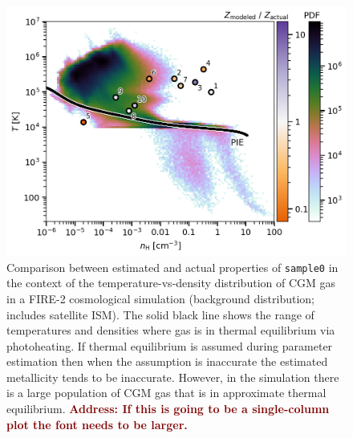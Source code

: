 \documentclass[fleqn,usenatbib]{mnras}
\newcommand{\todo}[1]{\textcolor{Maroon}{\textbf{Address: #1}}}
\begin{document}
\begin{figure}
    \centering
    \includegraphics[width=\columnwidth]{figures/sample0/phase_space.png}
    \caption{
    Comparison between estimated and actual properties of \texttt{sample0} in the context of the temperature-vs-density distribution of CGM gas in a FIRE-2 cosmological simulation (background distribution; includes satellite ISM).
    The solid black line shows the range of temperatures and densities where gas is in thermal equilibrium via photoheating.
    If thermal equilibrium is assumed during parameter estimation then when the assumption is inaccurate the estimated metallicity tends to be inaccurate.
    However, in the simulation there is a large population of CGM gas that is in approximate thermal equilibrium.
    \todo{If this is going to be a single-column plot the font needs to be larger.}
    }
    \label{f: idealized explanation}
\end{figure}
\end{document}
